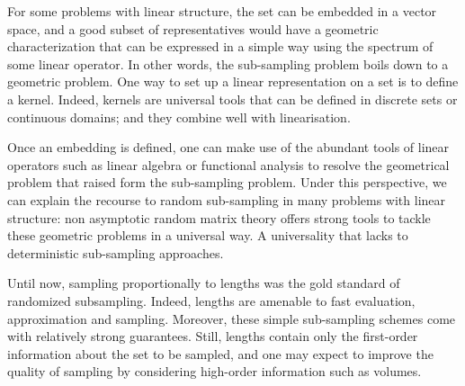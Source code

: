 \documentclass[twoside,11pt]{book}
\numberwithin{theorem}{chapter}
\numberwithin{definition}{chapter}
\numberwithin{proposition}{chapter}
\numberwithin{corollary}{chapter}
\numberwithin{example}{chapter}
\numberwithin{lemma}{chapter}
\numberwithin{assumption}{chapter}
\numberwithin{equation}{chapter}
\numberwithin{figure}{chapter}
\begin{document}
For some problems with linear structure, the set can be embedded in a vector space, and a good subset of representatives would have a geometric characterization that can be expressed in a simple way using the spectrum of some linear operator. In other words, the sub-sampling problem boils down to a geometric problem. One way to set up a linear representation on a set is to define a kernel. Indeed, 
kernels are universal tools that can be defined in discrete sets or continuous domains; and they combine well with linearisation.

Once an embedding is defined, one can make use of the abundant tools of linear operators such as linear algebra or functional analysis to resolve the geometrical problem that raised form the sub-sampling problem. Under this perspective, we can explain the recourse to random sub-sampling in many problems with linear structure: non asymptotic random matrix theory offers strong tools to tackle these geometric problems in a universal way. A universality that lacks to deterministic sub-sampling approaches.















Until now, sampling proportionally to lengths was the gold standard of randomized subsampling. Indeed, lengths are amenable to fast evaluation, approximation and sampling. Moreover, these simple sub-sampling schemes come with relatively strong guarantees. Still, lengths contain only the first-order information about the set to be sampled, and one may expect to improve the quality of sampling by considering high-order information such as volumes.
\end{document}

